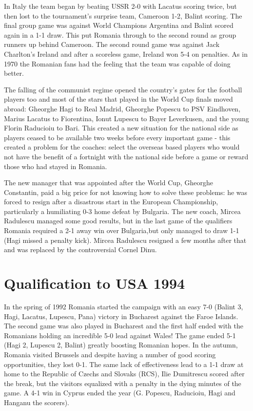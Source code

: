 In Italy the team began by beating USSR 2-0 with Lacatus scoring twice, but 
then lost to the tournament's surprise team, Cameroon 1-2, Balint scoring. The 
final group game was against World Champions Argentina and Balint scored again
in a 1-1 draw. This put Romania through to the second round as group runners up
behind Cameroon. The second round game was against Jack Charlton's Ireland and
after a scoreless game, Ireland won 5-4 on penalties. As in 1970 the Romanian
fans had the feeling that the team was capable of doing better.

The falling of the communist regime opened the country's gates for the football
players too and most of the stars that played in the World Cup finals moved
abroad: Gheorghe Hagi to Real Madrid, Gheorghe Popescu to PSV Eindhoven, Marius
Lacatus to Fiorentina, Ionut Lupescu to Bayer Leverkusen, and the young Florin
Raducioiu to Bari. This created a new situation for the national side as 
players ceased to be available two weeks before every important game - this 
created a problem for the coaches: select the overseas based players who would
not have the benefit of a fortnight with the national side before a game or 
reward those who had stayed in Romania.

The new manager that was appointed after the World Cup, Gheorghe Constantin, 
paid a big price for not knowing how to solve these problems: he was forced to 
resign after a disastrous start in the European Championship, particularly a 
humiliating 0-3 home defeat by Bulgaria. The new coach, Mircea Radulescu 
managed some good results, but in the last game of the qualifiers Romania
required a 2-1 away win over Bulgaria,but only managed to draw 1-1 (Hagi missed
a penalty kick). Mircea Radulescu resigned a few months after that and was
replaced by the controversial Cornel Dinu.

\section{Qualification to USA 1994}
In the spring of 1992 Romania started the campaign with an easy 7-0 (Balint 3,
Hagi, Lacatus, Lupescu, Pana) victory in Bucharest against the Faroe Islands. 
The second game was also played in Bucharest and the first half ended with the
Romanians holding an incredible 5-0 lead against Wales! The game ended 5-1 
(Hagi 2, Lupescu 2, Balint) greatly boosting Romanian hopes. In the autumn,
Romania visited Brussels and despite having a number of good scoring 
opportunities, they lost 0-1. The same lack of effectiveness lead to a 1-1 draw
at home to the Republic of Czechs and Slovaks (RCS), Ilie Dumitrescu scored 
after the break, but the visitors equalized with a penalty in the dying minutes
of the game. A 4-1 win in Cyprus ended the year (G. Popescu, Raducioiu, Hagi 
and Hanganu the scorers).

